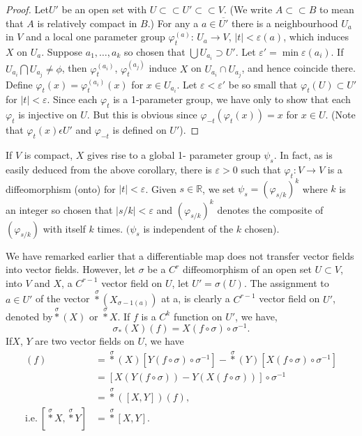 \begin{proof}
  Let\pageoriginale $U'$ be an open set with $U \subset \subset U' \subset \subset
  V$. (We write 
  $A \subset \subset B$ to mean that $A$ is relatively compact in
  $B$.)  For any a 
  $a \in \overline{U'}$ there is a neighbourhood $U_a$ in $V$ and a local
  one parameter group $\varphi^{(a)}_t$: $U_a \to V$, $|t|< \varepsilon
  (a)$, which induces $X$ on $U_a$. Suppose $a_1, \ldots , a_k$ so
  chosen that $\bigcup U_{a_i} \supset U'$. Let $\varepsilon ' = \min
  \varepsilon (a_i)$. If $U_{a_i} \bigcap U_{a_j} \neq \phi$, then
  $\varphi^{(a_i)}_t$, $\varphi^{(a_j)}_t $ induce $X$ on $U_{a_i}
  \cap U_{a_j}$, and hence coincide there. Define $\varphi_t(x) =
  \varphi^{(a_i)}_t (x)$ for $x \in U_{a_i}$. Let $\varepsilon <
  \varepsilon '$ be so small that $\varphi_t (U) \subset U'$ for $|t|
  < \varepsilon$. Since each $\varphi_t$ is a 1-parameter group, we
  have only to show that each $\varphi_t$ is injective on $U$. But
  this is obvious since $\varphi_{-t} (\varphi_t(x)) = x$ for $x \in
  U$. (Note that $\varphi_t (x) \epsilon U'$ and $\varphi_{-t}$ is
  defined on $U'$). 
\end{proof}

\begin{remark*}
  If $V$ is compact, $X$ gives rise to a global 1- parameter group $\psi_s$. In
  fact, as is easily deduced from the above corollary, there is
  $\varepsilon > 0$ such that $\varphi_t : V \to V$ is a
  diffeomorphism (onto) for $|t| < \varepsilon$. Given $s \in
  \mathbb{R}$, we set $\psi_s = (\varphi_{s/k})^k$ where $k$ is an
  integer so chosen that $|s/k| < \varepsilon$ and $(\varphi_{s/k})^k$
  denotes the composite of $(\varphi_{s/k})$ with itself $k$ times. $(
  \psi_s$ is independent of the $k$ chosen). 
\end{remark*}

We have remarked earlier that a differentiable map does not transfer
vector fields into vector fields. However, let $\sigma$ be a $C^r$
diffeomorphism of an open set $U \subset V$, into $V$ and $X$, a
$C^{r-1}$ vector field on $U$, let $U' = \sigma(U)$. The assignment to
$a \in U '$ of the vector $\overset{\sigma}{\ast} (X_{\sigma - 1(a)})$ at a, is
clearly a $C^{r-1}$ vector field on $U'$, denoted
by$\overset{\sigma}{\ast} (X)$ or
$\overset{\sigma}{\ast} X$. If $f$ is a $C^k$ function on $U'$, we have, 
$$
\sigma_* (X)(f) = X(f \circ \sigma) \circ \sigma^{-1}.
$$
If\pageoriginale $X$, $Y$ are two vector fields on $U$, we have
\begin{align*}
  [\overset{\sigma}{\ast} X, \sigma_* Y] (f) & =
  \overset{\sigma}{\ast}  (X) [Y (f \circ \sigma ) \circ
    \sigma^{-1}] - \overset{\sigma}{\ast} (Y) [X(f \circ \sigma )
    \circ \sigma^{-1}]\\  
  & = [X (Y(f \circ \sigma )) - Y (X(f \circ \sigma ))] \circ \sigma^{-1} \\
  & =  \overset{\sigma}{\ast}([X, Y]) (f), \\
  \text{i.e.}~ [\overset{\sigma}{\ast} X, \overset{\sigma}{\ast}  Y] &
  = \overset{\sigma}{\ast} [X, Y]. 
\end{align*}

